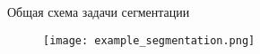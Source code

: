 
\begin{frame}{Общая схема задачи сегментации}
\begin{figure}
\centering
\texttt{[image: example\_segmentation.png]}
\end{figure}
\end{frame}